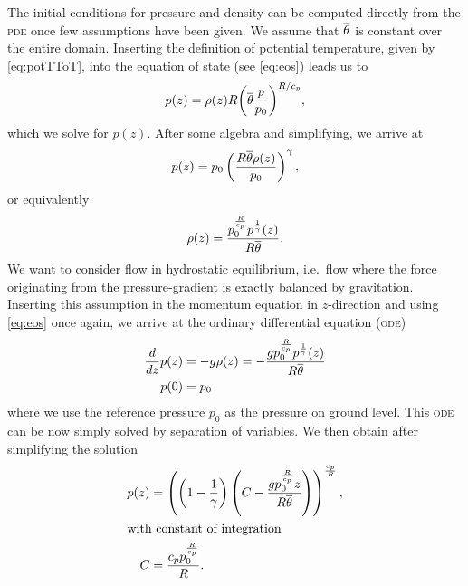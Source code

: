 The initial conditions for pressure and density can be computed directly from the \textsc{pde} once few assumptions have been given.
We assume that $\overline{\theta}$ is constant over the entire domain.
Inserting the definition of potential temperature, given by \cref{eq:potTToT}, into the equation of state (see \cref{eq:eos}) leads us to
\begin{equation}
  p(z) = \rho(z) R {\left( \overline{\theta} \frac{p}{p_0}\right)}^{R/c_p},
\end{equation}
which we solve for $p(z)$.
After some algebra and simplifying, we arrive at
\begin{equation}
 p(z) = p_0 \left( \frac{R \overline{\theta} \rho(z)}{p_0} \right)^{\gamma},
\end{equation}
or equivalently
\begin{equation}
  \label{eq:eos-potT}
\rho(z) = \frac{p_{0}^{\frac{R}{c_{p}}} p^{\frac{1}{\gamma}}{\left (z \right )}}{R \overline{\theta}}.
\end{equation}
We want to consider flow in hydrostatic equilibrium, i.e.\ flow where the force originating from the pressure-gradient is exactly balanced by gravitation.
Inserting this assumption in the momentum equation in $z$-direction and using \cref{eq:eos} once again, we arrive at the ordinary differential equation (\textsc{ode})
\begin{align}
  \label{eq:hydrostatic-balance-potT}
  \begin{split}
  \frac{d}{d z} p{\left (z \right )} &= -g \rho(z)
                                     = 
        - \frac{g p_{0}^{\frac{R}{c_{p}}} p^{\frac{1}{\gamma}}{\left (z \right )}}{R \overline{\theta}}\\
  p{\left (0 \right )} &= p_0
  \end{split}
\end{align}
where we use the reference pressure $p_0$ as the pressure on ground level.
This \textsc{ode} can be now simply solved by separation of variables.
We then obtain after simplifying the solution
\begin{align}
  \label{eq:hydrostatic-background-pressure}
p(z) &= \left(\left(1 - \frac{1}{\gamma}\right) \left(C - \frac{g p_{0}^{\frac{R}{c_{p}}} z}{R \overline{\theta}}\right)\right)^{\frac{c_{p}}{R}},\\
\shortintertext{with constant of integration}
 C &= \frac{c_{p} p_{0}^{\frac{R}{c_{p}}}}{R}.
\end{align}

